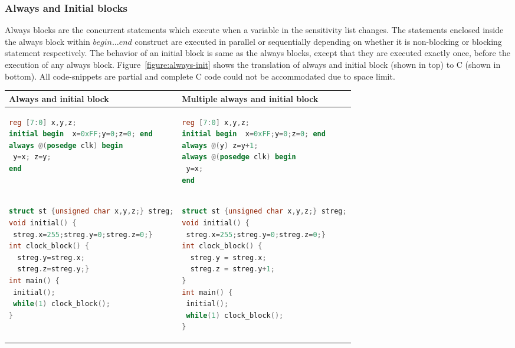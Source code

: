 \subsubsection{Always and Initial blocks}
Always blocks are the concurrent statements which execute when a 
variable in the sensitivity list changes. The statements enclosed inside the 
always block within $begin \ldots end$ construct are executed in parallel
or sequentially depending on whether it is non-blocking or blocking statement 
respectively.   The behavior of an initial block is same as the always blocks, 
except that they are executed exactly once, before the execution of any 
always block. Figure~\ref{figure:always-init} shows the translation of always
and initial block (shown in top) to C (shown in bottom). All code-snippets are
partial and complete C code could not be accommodated due to space limit.
%
\begin{figure*}[htbp]
\scriptsize
\centering
\begin{tabular}{l|l}
\hline
Always and initial block & Multiple always and initial block\\
\hline
\begin{lstlisting}[mathescape=true,language=Verilog]
reg [7:0] x,y,z;
initial begin  x=0xFF;y=0;z=0; end
always @(posedge clk) begin
 y=x; z=y;
end
\end{lstlisting}
& 
\begin{lstlisting}[mathescape=true,language=Verilog]
reg [7:0] x,y,z;
initial begin  x=0xFF;y=0;z=0; end
always @(y) z=y+1;
always @(posedge clk) begin
 y=x;
end
\end{lstlisting}
\\
\hline 
\begin{lstlisting}[mathescape=true,language=C]
struct st {unsigned char x,y,z;} streg;
void initial() {
 streg.x=255;streg.y=0;streg.z=0;}
int clock_block() {
  streg.y=streg.x; 
  streg.z=streg.y;}
int main() {
 initial();
 while(1) clock_block();
}
\end{lstlisting}
&
\begin{lstlisting}[mathescape=true,language=C]
struct st {unsigned char x,y,z;} streg;
void initial() { 
 streg.x=255;streg.y=0;streg.z=0;}
int clock_block() {
  streg.y = streg.x; 
  streg.z = streg.y+1;
}
int main() {
 initial();
 while(1) clock_block();
} 
\end{lstlisting}
\\
\hline
\end{tabular}
\caption{Handling always and initial blocks}
\label{figure:always-init}
\end{figure*}

